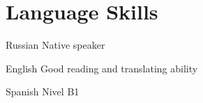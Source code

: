 \documentclass[11pt,a4paper,sans]{moderncv}
\newcommand{\lang}[2]{#2}
\begin{document}
\section
    {\lang
        {Языки}
        {Language Skills}}

\cvlanguage
    {\lang
        {Русский}
        {Russian}}
    {\lang
        {родной язык}
        {Native speaker}}
    {}

\cvlanguage
    {\lang
        {Английский}
        {English}}
    {\lang
        {технический, разговорный}
        {Good reading and translating ability}}
    {}

\cvlanguage
    {\lang
        {Испанский}
        {Spanish}}
    {\lang
        {уровень B1}
        {Nivel B1}}
    {}
\end{document}
